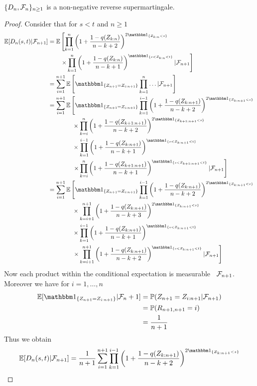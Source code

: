 \begin{lemma} \label{lem:dn_supermart}
	$\{D_n, \mathcal{F}_n\}_{n\geq 1}$ is a non-negative reverse supermartingale.
	\begin{proof}
		Consider that for $s<t$ and $n\geq 1$
		\begin{align*}
		\E[D_n(s,t)| \F_{n+1}] &= \E\left[\prod_{k=1}^{n}\left(1+\frac{1-q(Z_{k:n})}{n-k+2}\right)^{2\I{Z_{k:n} <s}}\right.\\
		&\qquad \left. \times \prod_{k=1}^{n}\left(1+\frac{1-q(Z_{k:n})}{n-k+1}\right)^\I{s < Z_{k:n} < t} | \F_{n+1}\right]\\
		&= \sum_{i=1}^{n+1}\E\left[\I{Z_{n+1} = Z_{i:n+1}} \prod_{k=1}^{n}\dots | \F_{n+1}\right]\\
		&= \sum_{i=1}^{n+1}\E\left[\I{Z_{n+1} = Z_{i:n+1}} \prod_{k=1}^{i-1}\left(1+\frac{1-q(Z_{k:n+1})}{n-k+2}\right)^{2\I{Z_{k:n+1} <s}} \right.\\
		&\qquad\qquad \times \prod_{k=i}^{n}\left(1+\frac{1-q(Z_{k+1:n+1})}{n-k+2}\right)^{2\I{Z_{k+1:n+1} <s}}\\
		&\qquad\qquad \times \prod_{k=1}^{i-1}\left(1+\frac{1-q(Z_{k:n+1})}{n-k+1}\right)^\I{s < Z_{k:n+1} < t}\\
		&\qquad\qquad \left. \times \prod_{k=i}^{n}\left(1+\frac{1-q(Z_{k+1:n+1})}{n-k+1}\right)^\I{s < Z_{k+1:n+1} < t}| \F_{n+1}\right]\\
		&= \sum_{i=1}^{n+1}\E\left[\I{Z_{n+1} = Z_{i:n+1}} \prod_{k=1}^{i-1}\left(1+\frac{1-q(Z_{k:n+1})}{n-k+2}\right)^{2\I{Z_{k:n+1} <s}} \right.\\
		&\qquad\qquad \times \prod_{k=i+1}^{n+1}\left(1+\frac{1-q(Z_{k:n+1})}{n-k+3}\right)^{2\I{Z_{k:n+1} <s}}\\
		&\qquad\qquad \times \prod_{k=1}^{i-1}\left(1+\frac{1-q(Z_{k:n+1})}{n-k+1}\right)^\I{s < Z_{k:n+1} < t}\\
		&\qquad\qquad \left. \times \prod_{k=i+1}^{n+1}\left(1+\frac{1-q(Z_{k:n+1})}{n-k+2}\right)^\I{s < Z_{k:n+1} < t}| \F_{n+1}\right]
		\end{align*}
		Now each product within the conditional expectation is measurable \wrt\ $\mathcal{F}_{n+1}$. Moreover we have for $i=1,\dots,n$ 
		\begin{align*}
		\E[\I{Z_{n+1}=Z_{i:n+1}}|\F_n+1] &= \P(Z_{n+1}=Z_{i:n+1}|\F_{n+1})\\
		&= \P(R_{n+1,n+1} = i)\\
		&= \frac{1}{n+1}
		\end{align*}
		Thus we obtain
		\begin{align*}
		\E[D_n(s,t)| \F_{n+1}] &= \frac{1}{n+1} \sum_{i=1}^{n+1} \prod_{k=1}^{i-1}\left(1+\frac{1-q(Z_{k:n+1})}{n-k+2}\right)^{2\I{Z_{k:n+1} <s}}\\

\end{align*}
\end{proof}
\end{lemma}
